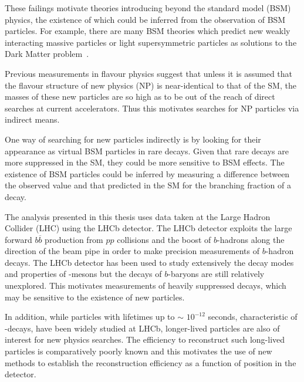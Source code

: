 These failings motivate theories introducing beyond the standard model (\Gls{BSM})  physics, the existence of which could be inferred from the observation of BSM particles. For example, there are many BSM theories which predict new weakly interacting massive particles or light supersymmetric particles as solutions to the Dark Matter problem~\cite{dark2014}.

Previous measurements in flavour physics suggest that unless it is assumed that the flavour structure of new physics (\Gls{NP}) is near-identical to that of the SM, the masses of these new particles are so high as to be out of the reach of direct searches at current accelerators\cite{kaonmix}. Thus this motivates searches for NP particles via indirect means.

One way of searching for new particles indirectly is by looking for their appearance as virtual BSM particles in rare decays. Given that rare decays are more suppressed in the SM, they could be more sensitive to BSM effects. The existence of BSM particles could be inferred by measuring a difference between the observed value and that predicted in the SM for the branching fraction of a decay. %

The analysis presented in this thesis uses data taken at the Large Hadron Collider (\Gls{LHC}) using the \Gls{LHCb} detector. The LHCb detector exploits the large forward $b\overline{b}$ production from $pp$ collisions and the  boost of $b$-hadrons along the direction of the beam pipe in order to make precision measurements of $b$-hadron decays. The LHCb detector has been used to study extensively the decay modes and properties of \B-mesons but the decays of $b$-baryons are still relatively unexplored. This motivates measurements of heavily suppressed \Lb decays, which may be sensitive to the existence of new particles.

In addition, while particles with lifetimes up to $\sim$ $10^{-12}$ seconds,  characteristic of \B-decays, have been widely studied at LHCb, longer-lived particles are also of interest for new physics searches. The efficiency to reconstruct such long-lived particles is comparatively poorly known and this motivates the use of new methods to establish the reconstruction efficiency as a function of position in the detector.

